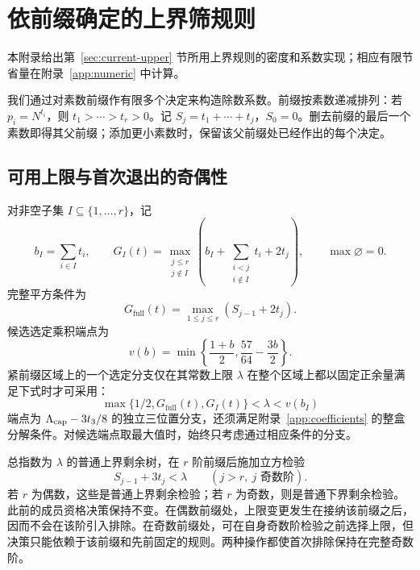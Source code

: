 \section{依前缀确定的上界筛规则}\label{app:upper}

本附录给出第~\ref{sec:current-upper} 节所用上界规则的密度和系数实现；相应有限节省量在附录~\ref{app:numeric} 中计算。

我们通过对素数前缀作有限多个决定来构造除数系数。前缀按素数递减排列：若 $p_i=N^{t_i}$，则 $t_1>\cdots>t_r>0$。记 $S_j=t_1+\cdots+t_j$，$S_0=0$。删去前缀的最后一个素数即得其父前缀；添加更小素数时，保留该父前缀处已经作出的每个决定。

\subsection{可用上限与首次退出的奇偶性}

对非空子集 $I\subseteq\{1,\ldots,r\}$，记
\begin{equation}\label{sv:selected-gate}
 b_I=\sum_{i\in I}t_i,\qquad
 G_I(t)=\max_{\substack{j\le r\\j\notin I}}
 \left(b_I+\sum_{\substack{i<j\\i\notin I}}t_i+2t_j\right),
 \qquad \max\varnothing=0.
\end{equation}
完整平方条件为
\begin{equation}\label{sv:full-gate}
 G_{\mathrm{full}}(t)=\max_{1\le j\le r}(S_{j-1}+2t_j).
\end{equation}
候选选定乘积端点为
\begin{equation}\label{sv:tent}
 v(b)=\min\left\{\frac{1+b}{2},\frac{57}{64}-\frac{3b}{2}\right\}.
\end{equation}
紧前缀区域上的一个选定分支仅在其常数上限 $\lambda$ 在整个区域上都以固定正余量满足下式时才可采用：
\begin{equation}\label{sv:branch-licence}
 \max\{1/2,G_{\mathrm{full}}(t),G_I(t)\}
       <\lambda<v(b_I)
\end{equation}
端点为 $\Lambda_{\rm cap}-3t_3/8$ 的独立三位置分支，还须满足附录~\ref{app:coefficients} 的整盒分解条件。对候选端点取最大值时，始终只考虑通过相应条件的分支。

总指数为 $\lambda$ 的普通上界剩余树，在 $r$ 阶前缀后施加立方检验
\begin{equation}\label{sv:upper-cubes}
 S_{j-1}+3t_j<\lambda\qquad(j>r,\ j\text{ 奇数阶}).
\end{equation}
若 $r$ 为偶数，这些是普通上界剩余检验；若 $r$ 为奇数，则是普通下界剩余检验。此前的成员资格决策保持不变。在偶数前缀处，上限变更发生在接纳该前缀之后，因而不会在该阶引入排除。在奇数前缀处，可在自身奇数阶检验之前选择上限，但决策只能依赖于该前缀和先前固定的规则。两种操作都使首次排除保持在完整奇数阶。

